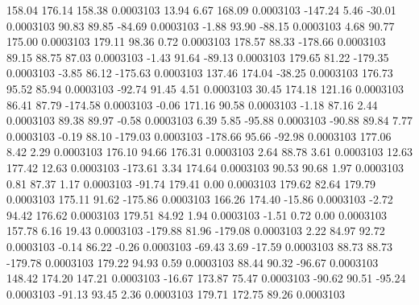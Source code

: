       158.04      176.14      158.38     0.0003103
       13.94        6.67      168.09     0.0003103
     -147.24        5.46      -30.01     0.0003103
       90.83       89.85      -84.69     0.0003103
       -1.88       93.90      -88.15     0.0003103
        4.68       90.77      175.00     0.0003103
      179.11       98.36        0.72     0.0003103
      178.57       88.33     -178.66     0.0003103
       89.15       88.75       87.03     0.0003103
       -1.43       91.64      -89.13     0.0003103
      179.65       81.22     -179.35     0.0003103
       -3.85       86.12     -175.63     0.0003103
      137.46      174.04      -38.25     0.0003103
      176.73       95.52       85.94     0.0003103
      -92.74       91.45        4.51     0.0003103
       30.45      174.18      121.16     0.0003103
       86.41       87.79     -174.58     0.0003103
       -0.06      171.16       90.58     0.0003103
       -1.18       87.16        2.44     0.0003103
       89.38       89.97       -0.58     0.0003103
        6.39        5.85      -95.88     0.0003103
      -90.88       89.84        7.77     0.0003103
       -0.19       88.10     -179.03     0.0003103
     -178.66       95.66      -92.98     0.0003103
      177.06        8.42        2.29     0.0003103
      176.10       94.66      176.31     0.0003103
        2.64       88.78        3.61     0.0003103
       12.63      177.42       12.63     0.0003103
     -173.61        3.34      174.64     0.0003103
       90.53       90.68        1.97     0.0003103
        0.81       87.37        1.17     0.0003103
      -91.74      179.41        0.00     0.0003103
      179.62       82.64      179.79     0.0003103
      175.11       91.62     -175.86     0.0003103
      166.26      174.40      -15.86     0.0003103
       -2.72       94.42      176.62     0.0003103
      179.51       84.92        1.94     0.0003103
       -1.51        0.72        0.00     0.0003103
      157.78        6.16       19.43     0.0003103
     -179.88       81.96     -179.08     0.0003103
        2.22       84.97       92.72     0.0003103
       -0.14       86.22       -0.26     0.0003103
      -69.43        3.69      -17.59     0.0003103
       88.73       88.73     -179.78     0.0003103
      179.22       94.93        0.59     0.0003103
       88.44       90.32      -96.67     0.0003103
      148.42      174.20      147.21     0.0003103
      -16.67      173.87       75.47     0.0003103
      -90.62       90.51      -95.24     0.0003103
      -91.13       93.45        2.36     0.0003103
      179.71      172.75       89.26     0.0003103
